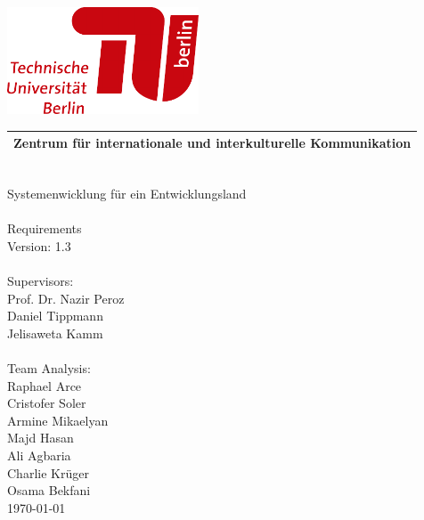\documentclass[12pt, a4paper, headinclude, footinclude, plainfootsepline]{scrreprt}
\begin{document}
\pagecolor{darkblue}

\hspace*{2cm}\includegraphics[width=57mm]{../Pictures/TULogo}

\begin{tabularx}{\textwidth}{C}
\\
\hline
\color{skyblue} Zentrum für internationale und interkulturelle Kommunikation\\
\hline
\end{tabularx}
\vspace*{5cm}\\
\hspace*{3cm}\color{skyblue}\Huge Systemenwicklung für ein Entwicklungsland 
\\
\vspace*{0,7cm}\\
\hspace*{3cm}\Large Requirements\\
\hspace*{3cm}\small Version: 1.3
\\
\vspace*{3cm}\\
\hspace*{3cm}\Large Supervisors:
\\
{\normalsize
	\hspace*{3.5cm}Prof. Dr. Nazir Peroz\\
	\hspace*{3.5cm}Daniel Tippmann\\
	\hspace*{3.5cm}Jelisaweta Kamm\\
}
\vspace*{0.5cm}\\
\hspace*{3cm}\Large Team Analysis:\\
{\normalsize
	\hspace*{3.5cm}Raphael Arce\\
	\hspace*{3.5cm}Cristofer Soler\\
	\hspace*{3.5cm}Armine Mikaelyan\\
	\hspace*{3.5cm}Majd Hasan\\
	\hspace*{3.5cm}Ali Agbaria\\
	\hspace*{3.5cm}Charlie Krüger\\
	\hspace*{3.5cm}Osama Bekfani\\
}
\hspace*{14cm}\large \today
\end{document}
